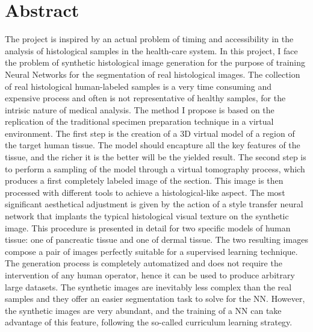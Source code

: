 \chapter*{Abstract}
The project is inspired by an actual problem of timing and accessibility in the analysis of histological samples in the health-care system. In this project, I face the problem of synthetic histological image generation for the purpose of training Neural Networks for the segmentation of real histological images. The collection of real histological human-labeled samples is a very time consuming and expensive process and often is not representative of healthy samples, for the intrisic nature of medical analysis. The method I propose is based on the replication of the traditional specimen preparation technique in a virtual environment. The first step is the creation of a 3D virtual model of a region of the target human tissue. The model should encapture all the key features of the tissue, and the richer it is the better will be the yielded result. The second step is to perform a sampling of the model through a virtual tomography process, which produces a first completely labeled image of the section. This image is then processed with different tools to achieve a histological-like aspect. The most significant aesthetical adjustment is given by the action of a style transfer neural network that implants the typical histological visual texture on the synthetic image. This procedure is presented in detail for two specific models of human tissue: one of pancreatic tissue and one of dermal tissue. The two resulting images compose a pair of images perfectly suitable for a supervised learning technique. The generation process is completely automatized and does not require the intervention of any human operator, hence it can be used to produce arbitrary large datasets. The synthetic images are inevitably less complex than the real samples and they offer an easier segmentation task to solve for the NN. However, the synthetic images are very abundant, and the training of a NN can take advantage of this feature, following the so-called curriculum learning strategy.
